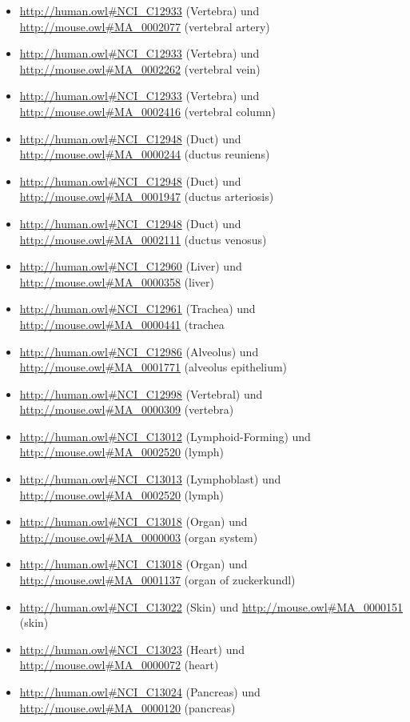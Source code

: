 \begin{itemize}
	\item \url{http://human.owl#NCI_C12933} (Vertebra) und \url{http://mouse.owl#MA_0002077} (vertebral artery)
	\item \url{http://human.owl#NCI_C12933} (Vertebra) und \url{http://mouse.owl#MA_0002262} (vertebral vein)
	\item \url{http://human.owl#NCI_C12933} (Vertebra) und \url{http://mouse.owl#MA_0002416} (vertebral column)
	\item \url{http://human.owl#NCI_C12948} (Duct) und \url{http://mouse.owl#MA_0000244} (ductus reuniens)
	\item \url{http://human.owl#NCI_C12948} (Duct) und \url{http://mouse.owl#MA_0001947} (ductus arteriosis)
	\item \url{http://human.owl#NCI_C12948} (Duct) und \url{http://mouse.owl#MA_0002111} (ductus venosus)
	\item \url{http://human.owl#NCI_C12960} (Liver\textunderscoreStem\textunderscoreCell) und \url{http://mouse.owl#MA_0000358} (liver)
	\item \url{http://human.owl#NCI_C12961} (Trachea\textunderscoreund\textunderscoreBronchus) und \url{http://mouse.owl#MA_0000441} (trachea
	\item \url{http://human.owl#NCI_C12986} (Alveolus) und \url{http://mouse.owl#MA_0001771} (alveolus epithelium)
	\item \url{http://human.owl#NCI_C12998} (Vertebral\textunderscoreColumn) und \url{http://mouse.owl#MA_0000309} (vertebra)
	\item \url{http://human.owl#NCI_C13012} (Lymphoid\textunderscoreBlood-Forming\textunderscoreCell) und \url{http://mouse.owl#MA_0002520} (lymph)
	\item \url{http://human.owl#NCI_C13013} (Lymphoblast) und \url{http://mouse.owl#MA_0002520} (lymph)
	\item \url{http://human.owl#NCI_C13018} (Organ) und \url{http://mouse.owl#MA_0000003} (organ system)
	\item \url{http://human.owl#NCI_C13018} (Organ) und \url{http://mouse.owl#MA_0001137} (organ of zuckerkundl)
	\item \url{http://human.owl#NCI_C13022} (Skin\textunderscorePart) und \url{http://mouse.owl#MA_0000151} (skin)
	\item \url{http://human.owl#NCI_C13023} (Heart\textunderscorePart) und \url{http://mouse.owl#MA_0000072} (heart)
	\item \url{http://human.owl#NCI_C13024} (Pancreas\textunderscorePart) und \url{http://mouse.owl#MA_0000120} (pancreas)

\end{itemize}
